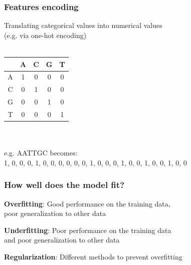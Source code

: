 \documentclass[aspectratio=169]{beamer}
\begin{document}
\begin{frame}
  \frametitle{Features encoding}
  \begin{block}{}
    \begin{center}
      Translating categorical values into numerical values\\
      (e.g. via one-hot encoding)\\ \ \\

      {\small
        \begin{tabular}{|c|c|c|c|c|}
          \hline
          \textbf{} & \textbf{A} & \textbf{C} & \textbf{G} & \textbf{T}\\
          \hline
          A & 1 & 0 & 0 & 0 \\
          C & 0 & 1 & 0 & 0 \\
          G & 0 & 0 & 1 & 0 \\
          T & 0 & 0 & 0 & 1 \\
          \hline
        \end{tabular}

        \ \\ \ \\
        e.g. AATTGC becomes:\\ 
        \colorbox{white}{1, 0, 0, 0,}
        \colorbox{white}{1, 0, 0, 0,}
        \colorbox{white}{0, 0, 0, 1,}
        \colorbox{white}{0, 0, 0, 1,}
        \colorbox{white}{0, 0, 1, 0,}
        \colorbox{white}{0, 1, 0, 0}\\
      }
    \end{center}  
  \end{block}  
\end{frame}

\begin{frame}
  \frametitle{How well does the model fit?}

  \begin{block}{}
    \begin{center}
      \textbf{Overfitting}: Good performance on the training data,\\ poor
      generalization to other data\\      
    \end{center}
  \end{block}
  \begin{block}{}
    \begin{center}
      \textbf{Underfitting}: Poor performance on the training data\\ and
      poor generalization to other data\\
    \end{center}
  \end{block}
  
  \begin{block}{}
    \begin{center}
      \textbf{Regularization}: Different methods to prevent overfitting\\
    \end{center}
  \end{block}
\end{frame}
\end{document}
